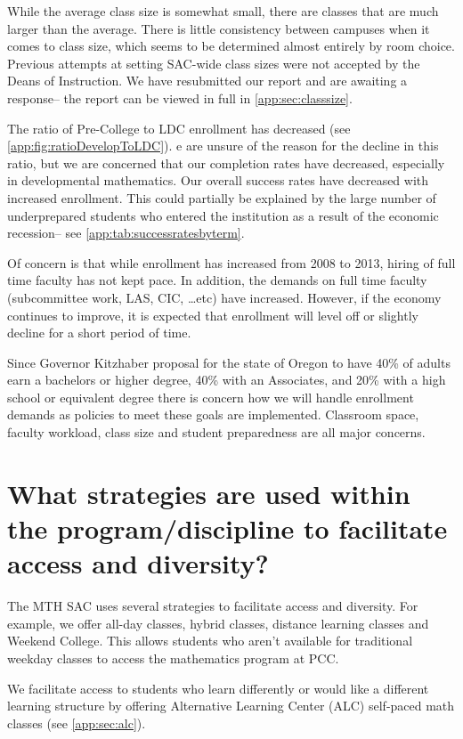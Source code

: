 While the average class size is somewhat small, there are classes that are much larger than the average. There is little consistency between campuses when it comes to class size, which seems to be determined almost entirely by room choice. Previous attempts at setting SAC-wide class sizes were not accepted by the Deans of Instruction. We have resubmitted our report and are awaiting a response-- the report can be viewed in full in \vref{app:sec:classsize}.

The ratio of Pre-College to LDC enrollment has decreased (see \vref{app:fig:ratioDevelopToLDC}). e are unsure of the reason for the decline in this ratio, but we are concerned that our completion rates have decreased, especially in developmental mathematics. Our overall success rates have decreased with increased enrollment.  This could partially be explained by the large number of underprepared students who entered the institution as a result of the economic recession-- see \vref{app:tab:successratesbyterm}.

Of concern is that while enrollment has increased from 2008 to 2013, hiring of full time faculty has not kept pace. In addition, the demands on full time faculty (subcommittee work, LAS, CIC, \ldots etc) have increased.   However, if the economy continues to improve, it is expected that enrollment will level off or slightly decline for a short period of time.

Since Governor Kitzhaber proposal for the state of Oregon to have 40\% of adults earn a bachelors or higher degree, 40\% with an Associates, and 20\% with a high school or equivalent degree there is concern how we will handle enrollment demands as policies to meet these goals are implemented.    Classroom space, faculty workload, class size and student preparedness are all major concerns.

\section{What strategies are used within the program/discipline to facilitate access and diversity?}
The MTH SAC uses several strategies to facilitate access and diversity. For example, we offer all-day classes, hybrid classes, distance learning classes and Weekend College. This allows students who aren’t available for traditional weekday classes to access the mathematics program at PCC. 

We facilitate access to students who learn differently or would like a different learning structure by offering  Alternative Learning Center (ALC) self-paced math classes (see \vref{app:sec:alc}).

